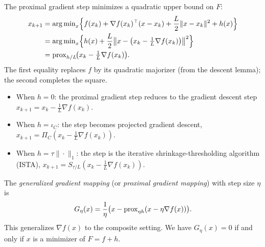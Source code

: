 \documentclass[11pt,a4paper]{article}
\begin{document}
\begin{remark}%
\label{rem:mm}
The proximal gradient step minimizes a quadratic upper bound on $F$:
\begin{align}
  x_{k+1}
  &= \operatorname{arg\,min}_x \Bigl\{f(x_k) + \nabla f(x_k)^\top(x - x_k)
    + \frac{L}{2}\|x - x_k\|^2 + h(x)\Bigr\} \notag \\
  &= \operatorname{arg\,min}_x \Bigl\{h(x)
    + \frac{L}{2}\bigl\|x - \bigl(x_k - \tfrac{1}{L}\nabla f(x_k)\bigr)
    \bigr\|^2\Bigr\} \notag \\
  &= \operatorname{prox}_{h/L}\!\bigl(x_k - \tfrac{1}{L}\nabla f(x_k)\bigr).
    \label{eq:mm-interp}
\end{align}
The first equality replaces $f$ by its quadratic majorizer
(from the descent lemma); the second completes the square.
\end{remark}

\begin{remark}\label{rem:special-cases}
\begin{itemize}
  \item When $h = 0$: the proximal gradient step reduces to the
    gradient descent step $x_{k+1} = x_k - \frac{1}{L}\nabla f(x_k)$.
  \item When $h = \iota_C$: the step becomes projected gradient descent,
    $x_{k+1} = \Pi_C(x_k - \frac{1}{L}\nabla f(x_k))$.
  \item When $h = \tau\|\cdot\|_1$: the step is the iterative
    shrinkage-thresholding algorithm (ISTA),
    $x_{k+1} = S_{\tau/L}(x_k - \frac{1}{L}\nabla f(x_k))$.
\end{itemize}
\end{remark}

\begin{definition}\label{def:grad-mapping}
The \emph{generalized gradient mapping} (or \emph{proximal gradient
mapping}) with step size $\eta$ is
\begin{equation}\label{eq:grad-mapping}
  G_\eta(x) = \frac{1}{\eta}\bigl(x - \operatorname{prox}_{\eta h}(x - \eta\nabla f(x))\bigr).
\end{equation}
This generalizes $\nabla f(x)$ to the composite setting. We have
$G_\eta(x) = 0$ if and only if $x$ is a minimizer of $F = f + h$.
\end{definition}

\end{document}
